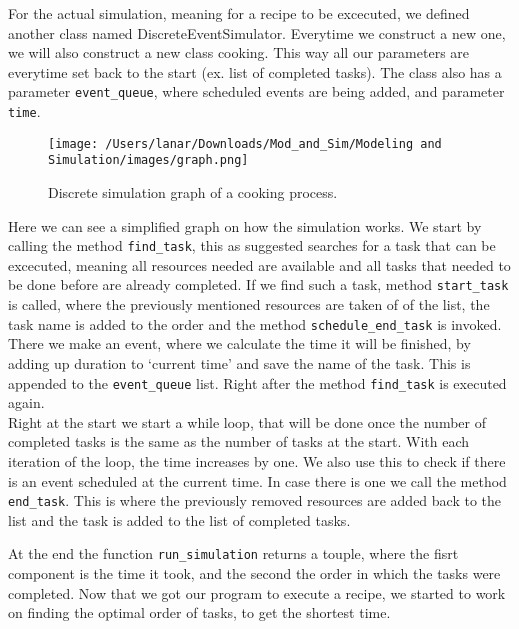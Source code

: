 For the actual simulation, meaning for a recipe to be excecuted, we defined another class named DiscreteEventSimulator. 
Everytime we construct a new one, we will also construct a new class cooking. This way all our parameters are everytime set back to the start (ex. list of completed tasks).
The class also has a parameter \texttt{event\_queue}, where scheduled events are being added, and parameter \texttt{time}. \\

\begin{figure}[H]
    \centerline{\texttt{[image: /Users/lanar/Downloads/Mod\_and\_Sim/Modeling and Simulation/images/graph.png]}}
    \caption{Discrete simulation graph of a cooking process.}
    \label{fig1}
\end{figure}

Here we can see a simplified graph on how the simulation works. We start by calling the method \texttt{find\_task}, this as suggested searches for a task that can be excecuted, meaning all resources needed are available 
and all tasks that needed to be done before are already completed. If we find such a task, method \texttt{start\_task} is called, where the previously mentioned resources are taken of of the list, the task name is added to the order and the method \texttt{schedule\_end\_task} is invoked. 
There we make an event, where we calculate the time it will be finished, by adding up duration to `current time' and save the name of the task. This is appended to the \texttt{event\_queue} list. Right after the method \texttt{find\_task} is executed again. \\ 

Right at the start we start a while loop, that will be done once the number of completed tasks is the same as the number of tasks at the start. 
With each iteration of the loop, the time increases by one. We also use this to check if there is an event scheduled at the current time. In case there is one we call the method \texttt{end\_task}. 
This is where the previously removed resources are added back to the list and the task is added to the list of completed tasks. 

At the end the function \texttt{run\_simulation} returns a touple, where the fisrt component is the time it took, and the second the order in which the tasks were completed. 
Now that we got our program to execute a recipe, we started to work on finding the optimal order of tasks, to get the shortest time. 

